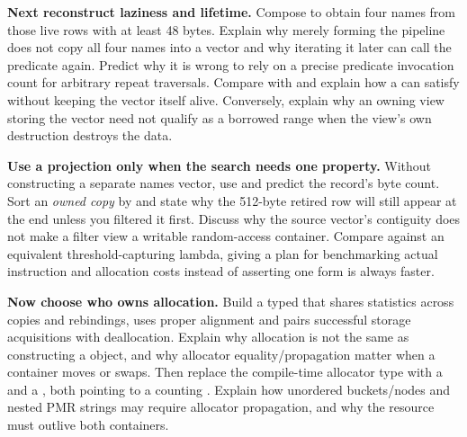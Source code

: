 \textbf{Next reconstruct laziness and lifetime.} Compose  to obtain four names from those live rows with at least 48 bytes. Explain why merely forming the pipeline does not copy all four names into a vector and why iterating it later can call the predicate again. Predict why it is wrong to rely on a precise predicate invocation count for arbitrary repeat traversals. Compare  with  and explain how a  can satisfy  without keeping the vector itself alive. Conversely, explain why an owning view storing the vector need not qualify as a borrowed range when the view's own destruction destroys the data.

\textbf{Use a projection only when the search needs one property.} Without constructing a separate names vector, use  and predict the record's byte count. Sort an \emph{owned copy} by  and state why the 512-byte retired row will still appear at the end unless you filtered it first. Discuss why the source vector's contiguity does not make a filter view a writable random-access container. Compare  against an equivalent threshold-capturing lambda, giving a plan for benchmarking actual instruction and allocation costs instead of asserting one form is always faster.

\textbf{Now choose who owns allocation.} Build a typed  that shares statistics across copies and rebindings, uses proper alignment and pairs successful storage acquisitions with deallocation. Explain why allocation is not the same as constructing a  object, and why allocator equality/propagation matter when a container moves or swaps. Then replace the compile-time allocator type with a  and a , both pointing to a counting . Explain how unordered buckets/nodes and nested PMR strings may require allocator propagation, and why the resource must outlive both containers.

